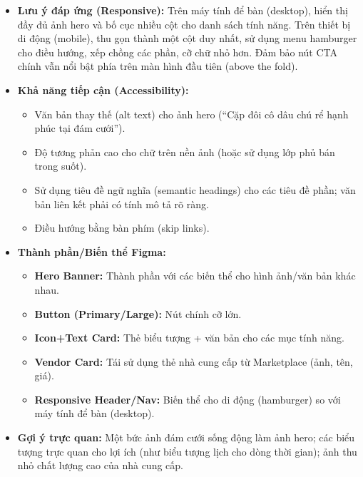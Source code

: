 \documentclass[11pt,a4paper]{article}
\begin{document}
\begin{itemize}
    \item \textbf{Lưu ý đáp ứng (Responsive):} Trên máy tính để bàn (desktop), hiển thị đầy đủ ảnh hero và bố cục nhiều cột cho danh sách tính năng. Trên thiết bị di động (mobile), thu gọn thành một cột duy nhất, sử dụng menu hamburger cho điều hướng, xếp chồng các phần, cỡ chữ nhỏ hơn. Đảm bảo nút CTA chính vẫn nổi bật phía trên màn hình đầu tiên (above the fold).
    \item \textbf{Khả năng tiếp cận (Accessibility):}
    \begin{itemize}
        \item Văn bản thay thế (alt text) cho ảnh hero (``Cặp đôi cô dâu chú rể hạnh phúc tại đám cưới'').
        \item Độ tương phản cao cho chữ trên nền ảnh (hoặc sử dụng lớp phủ bán trong suốt).
        \item Sử dụng tiêu đề ngữ nghĩa (semantic headings) cho các tiêu đề phần; văn bản liên kết phải có tính mô tả rõ ràng.
        \item Điều hướng bằng bàn phím (skip links).
    \end{itemize}
    \item \textbf{Thành phần/Biến thể Figma:}
    \begin{itemize}
        \item \textbf{Hero Banner:} Thành phần với các biến thể cho hình ảnh/văn bản khác nhau.
        \item \textbf{Button (Primary/Large):} Nút chính cỡ lớn.
        \item \textbf{Icon+Text Card:} Thẻ biểu tượng + văn bản cho các mục tính năng.
        \item \textbf{Vendor Card:} Tái sử dụng thẻ nhà cung cấp từ Marketplace (ảnh, tên, giá).
        \item \textbf{Responsive Header/Nav:} Biến thể cho di động (hamburger) so với máy tính để bàn (desktop).
    \end{itemize}
    \item \textbf{Gợi ý trực quan:} Một bức ảnh đám cưới sống động làm ảnh hero; các biểu tượng trực quan cho lợi ích (như biểu tượng lịch cho dòng thời gian); ảnh thu nhỏ chất lượng cao của nhà cung cấp.
\end{itemize}
\end{document}
